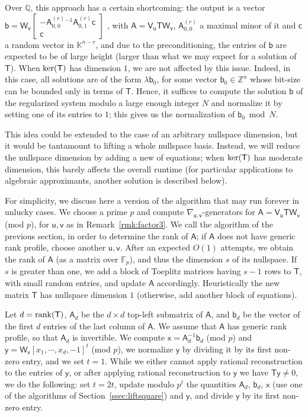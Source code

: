 \documentclass[sigconf]{acmart}
\newcommand{\vb}{\ensuremath{\mathsf{b}}}
\newcommand{\vc}{\ensuremath{\mathsf{c}}}
\newcommand{\vu}{\ensuremath{\mathsf{u}}}
\newcommand{\vv}{\ensuremath{\mathsf{v}}}
\newcommand{\vx}{\ensuremath{\mathsf{x}}}
\newcommand{\vy}{\ensuremath{\mathsf{y}}}
\newcommand{\mA}{\ensuremath{\mathsf{A}}}
\newcommand{\mT}{\ensuremath{\mathsf{T}}}
\newcommand{\mV}{\ensuremath{\mathsf{V}}}
\newcommand{\mW}{\ensuremath{\mathsf{W}}}
\newcommand{\K}{\ensuremath{\mathbb{K}}}
\newcommand{\Q}{\ensuremath{\mathbb{Q}}}
\newcommand{\Z}{\ensuremath{\mathbb{Z}}}
\theoremstyle{acmdefinition}
\begin{document}
Over $\Q$, this approach has a certain shortcoming: the output is a
vector
%
$\vb=\mW_{\vv}
\left[\begin{smallmatrix} 
-\mA^{(r)}_{0,0}{}^{-1} \mA^{(r)}_{0,1} \vc \\ 
\vc
\end{smallmatrix}\right]$
%
, with $\mA=\mV_\vu \mT \mW_{\vv}$, $\mA^{(r)}_{0,0}$ a maximal minor
of it and $\vc$ a random vector in $\K^{n-r}$, and due to the
preconditioning, the entries of $\vb$ are expected to be of large
height (larger than what we may expect for a solution of $\mT$). When
${\rm ker}(\mT)$ has dimension $1$, we are not affected by this
issue. Indeed, in this case, all solutions are of the form
$\lambda \vb_0$, for some vector $\vb_0 \in \Z^n$ whose bit-size can
be bounded only in terms of $\mT$. Hence, it suffices to compute the
solution $\vb$ of the regularized system modulo a large enough integer
$N$ and normalize it by setting one of its entries to $1$; this gives
us the normalization of $\vb_0 \bmod N$.

This idea could be extended to the case of an arbitrary nullspace
dimension, but it would be tantamount to lifting a whole nullspace
basis. Instead, we will reduce the nullspace dimension by adding a new
of equations; when ${\rm ker}(\mT)$ has moderate dimension, this
barely affects the overall runtime (for particular applications to
algebraic approximants, another solution is described below).

For simplicity, we discuss here a version of the algorithm that may
run forever in unlucky cases. We choose a prime $p$ and compute
$\nabla_{\vu,\vv}$-generators for $\mA = \mV_\vu \mT \mW_{\vv}$ (mod
$p$), for $\vu,\vv$ as in Remark~\ref{rmk:factor3}. We call the
algorithm of the previous section, in order to determine the rank of
$\mA$; if $\mA$ does not have generic rank profile, choose another
$\vu,\vv$. After an expected $O(1)$ attempts, we obtain the rank of
$\mA$ (as a matrix over $\mathbb{F}_p$), and thus the dimension $s$ of
its nullspace. If $s$ is greater than one, we add a block of Toeplitz
matrices having $s-1$ rows to $\mT$, with small random entries, and
update $\mA$ accordingly. Heuristically the new matrix $\mT$ has
nullspace dimension $1$ (otherwise, add another block of equations).

Let $d={\rm rank}(\mT)$, $\mA_{d}$ be the $d \times d$ top-left
submatrix of $\mA$, and $\vb_d$ be the vector of the first $d$ entries
of the last column of $\mA$. We assume that $\mA$ has generic rank
profile, so that $\mA_{d}$ is invertible.  We compute
$\vx = \mA_d^{-1} \vb_d$ (mod $p$) and
$\vy = \mW_\vv [x_1, \cdots, x_d, -1]^t$ (mod $p$), we normalize $\vy$
by dividing it by its first non-zero entry, and we set $t=1$.  While
we either cannot apply rational reconstruction to the entries of
$\vy$, or after applying rational reconstruction to $\vy$ we have
$\mT \vy \ne 0$, we do the following: set $t = 2t$, update modulo
$p^t$ the quantities $\mA_{d}$, $\vb_d$, $\vx$ (use one of the
algorithms of Section~\ref{ssec:liftsquare}) and $\vy$, and divide
$\vy$ by its first non-zero entry.
\end{document}
